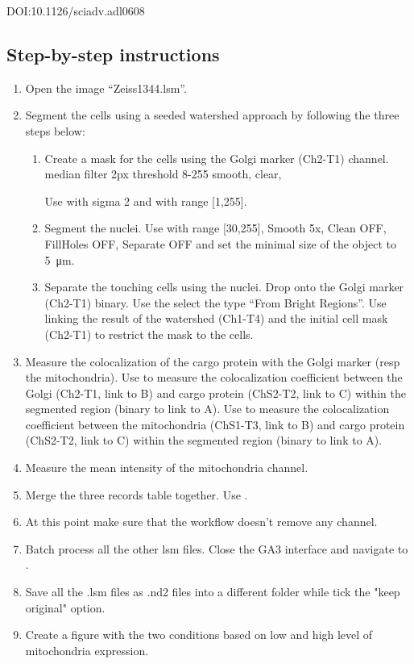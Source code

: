 DOI:10.1126/sciadv.adl0608

\subsection{Step-by-step instructions}
\begin{enumerate}
    \item Open the image ``Zeiss1344.lsm''.
    \item Segment the cells using a seeded watershed approach by following the three steps below:
    \begin{enumerate}
        \item Create a mask for the cells using the Golgi marker (Ch2-T1) channel. 
median filter 2px
threshold 8-255
smooth, clear, 


\soln Use  with sigma 2 and  with range [1,255]. \solnend
        \item Segment the nuclei. \soln Use  with range [30,255], Smooth 5x, Clean OFF, FillHoles OFF, Separate OFF and set the minimal size of the object to \SI{5}{\micro\meter}. \solnend
        \item Separate the touching cells using the nuclei. Drop  onto the Golgi marker (Ch2-T1) binary. Use the  select the type ``From Bright Regions''. Use  linking the result of the watershed (Ch1-T4) and the initial cell mask (Ch2-T1) to restrict the mask to the cells.
    \end{enumerate}
    \item Measure the colocalization of the cargo protein with the Golgi marker (resp the mitochondria). Use  to measure the colocalization coefficient between the Golgi (Ch2-T1, link to B) and cargo protein (ChS2-T2, link to C) within the segmented region (binary to link to A). Use  to measure the colocalization coefficient between the mitochondria (ChS1-T3, link to B) and cargo protein (ChS2-T2, link to C) within the segmented region (binary to link to A).
    \item Measure the mean intensity of the mitochondria channel.
    \item Merge the three records table together. \soln Use . \solnend
    \item At this point make sure that the workflow doesn’t remove any channel.
    \item Batch process all the other lsm files. Close the GA3 interface and navigate to .
    \item Save all the .lsm files as .nd2 files into a different folder while tick the "keep original" option.
    \item Create a figure with the two conditions based on low and high level of mitochondria expression.
\end{enumerate}
